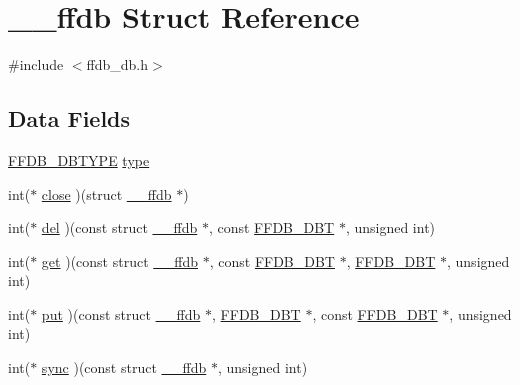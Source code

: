 \hypertarget{struct____ffdb}{}\section{\+\_\+\+\_\+ffdb Struct Reference}
\label{struct____ffdb}


{\ttfamily \#include $<$ffdb\+\_\+db.\+h$>$}

\subsection*{Data Fields}
\begin{DoxyCompactItemize}
\item 
\mbox{\hyperlink{adat-devel_2other__libs_2filedb_2filehash_2ffdb__db_8h_ad525b587adc6d7028c6f7bf7e8204185}{F\+F\+D\+B\+\_\+\+D\+B\+T\+Y\+PE}} \mbox{\hyperlink{struct____ffdb_a97cc74bb16c35a0a927331f4e2aa0734}{type}}
\item 
int($\ast$ \mbox{\hyperlink{struct____ffdb_a5619a53c055a8822d1ee1f75eb5308f6}{close}} )(struct \mbox{\hyperlink{struct____ffdb}{\+\_\+\+\_\+ffdb}} $\ast$)
\item 
int($\ast$ \mbox{\hyperlink{struct____ffdb_a88791473b56c4423cc6599c92f960973}{del}} )(const struct \mbox{\hyperlink{struct____ffdb}{\+\_\+\+\_\+ffdb}} $\ast$, const \mbox{\hyperlink{adat-devel_2other__libs_2filedb_2filehash_2ffdb__db_8h_aa2e0984399491df0fdd20898ca8758f9}{F\+F\+D\+B\+\_\+\+D\+BT}} $\ast$, unsigned int)
\item 
int($\ast$ \mbox{\hyperlink{struct____ffdb_a8a7764381b955beff42d80df7d895f15}{get}} )(const struct \mbox{\hyperlink{struct____ffdb}{\+\_\+\+\_\+ffdb}} $\ast$, const \mbox{\hyperlink{adat-devel_2other__libs_2filedb_2filehash_2ffdb__db_8h_aa2e0984399491df0fdd20898ca8758f9}{F\+F\+D\+B\+\_\+\+D\+BT}} $\ast$, \mbox{\hyperlink{adat-devel_2other__libs_2filedb_2filehash_2ffdb__db_8h_aa2e0984399491df0fdd20898ca8758f9}{F\+F\+D\+B\+\_\+\+D\+BT}} $\ast$, unsigned int)
\item 
int($\ast$ \mbox{\hyperlink{struct____ffdb_a63b3f6dcb802e3ed86921fd618eeee52}{put}} )(const struct \mbox{\hyperlink{struct____ffdb}{\+\_\+\+\_\+ffdb}} $\ast$, \mbox{\hyperlink{adat-devel_2other__libs_2filedb_2filehash_2ffdb__db_8h_aa2e0984399491df0fdd20898ca8758f9}{F\+F\+D\+B\+\_\+\+D\+BT}} $\ast$, const \mbox{\hyperlink{adat-devel_2other__libs_2filedb_2filehash_2ffdb__db_8h_aa2e0984399491df0fdd20898ca8758f9}{F\+F\+D\+B\+\_\+\+D\+BT}} $\ast$, unsigned int)
\item 
int($\ast$ \mbox{\hyperlink{struct____ffdb_ac62e77f33be0e087840288a34afa7505}{sync}} )(const struct \mbox{\hyperlink{struct____ffdb}{\+\_\+\+\_\+ffdb}} $\ast$, unsigned int)

\end{DoxyCompactItemize}

